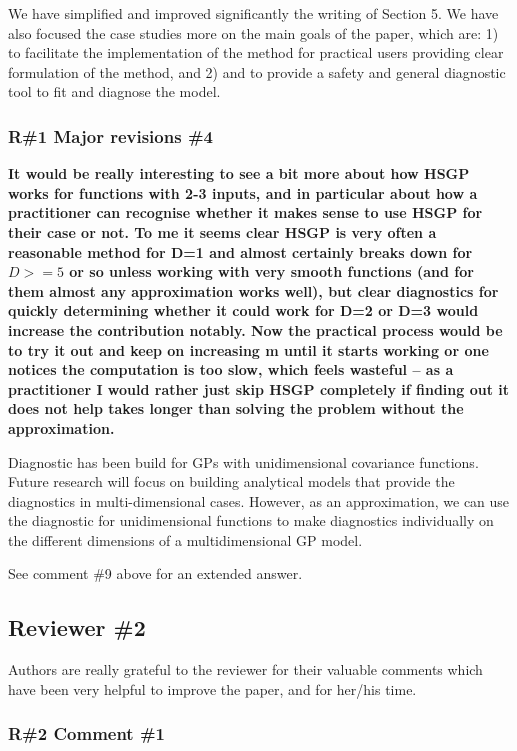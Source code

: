 \documentclass[11pt]{report}
\begin{document}
We have simplified and improved significantly the writing of Section 5. We have also focused the case studies more on the main goals of the paper, which are: 1) to facilitate the implementation of the method for practical users providing clear formulation of the method, and 2) and to provide a safety and general diagnostic tool to fit and diagnose the model.
 

\subsubsection*{R\#1 Major revisions \#4}

\textbf{It would be really interesting to see a bit more about how HSGP works for functions with 2-3 inputs, and in particular about how a practitioner can recognise whether it makes sense to use HSGP for their case or not. To me it seems clear HSGP is very often a reasonable method for D=1 and almost certainly breaks down for $D>=5$ or so unless working with very smooth functions (and for them almost any approximation works well), but clear diagnostics for quickly determining whether it could work for D=2 or D=3 would increase the contribution notably. Now the practical process would be to try it out and keep on increasing m until it starts working or one notices the computation is too slow, which feels wasteful -- as a practitioner I would rather just skip HSGP completely if finding out it does not help takes longer than solving the problem without the approximation.}

Diagnostic has been build for GPs with unidimensional covariance functions. Future research will focus on building analytical models that provide the diagnostics in multi-dimensional cases. However, as an approximation, we can use the diagnostic for unidimensional functions to make diagnostics individually on the different dimensions of a multidimensional GP model. 

See comment \#9 above for an extended answer.

\noindent \hdashrule{12.5cm}{0.2pt}{2mm 1pt}

\subsection*{Reviewer \#2}

Authors are really grateful to the reviewer for their valuable comments which have been very helpful to improve the paper, and for her/his time.

\subsubsection*{R\#2 Comment \#1}
\end{document}
